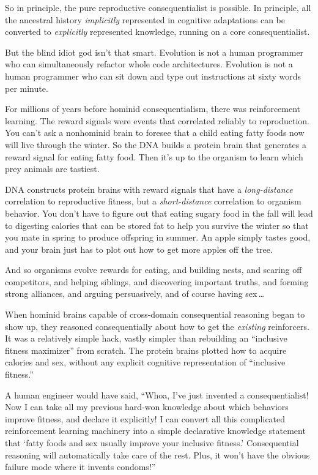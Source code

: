  So in principle, the pure reproductive consequentialist is
possible. In principle, all the ancestral history \textit{implicitly}
represented in cognitive adaptations can be converted to
\textit{explicitly} represented knowledge, running on a core
consequentialist.


 But the blind idiot god isn't that smart.
Evolution is not a human programmer who can simultaneously refactor
whole code architectures. Evolution is not a human programmer who can
sit down and type out instructions at sixty words per minute.


 For millions of years before hominid consequentialism, there was
reinforcement learning. The reward signals were events that correlated
reliably to reproduction. You can't ask a nonhominid
brain to foresee that a child eating fatty foods now will live through
the winter. So the DNA builds a protein brain that generates a reward
signal for eating fatty food. Then it's up to the
organism to learn which prey animals are tastiest.


 DNA constructs protein brains with reward signals that have a
\textit{long-distance} correlation to reproductive fitness, but a
\textit{short-distance} correlation to organism behavior. You
don't have to figure out that eating sugary food in the
fall will lead to digesting calories that can be stored fat to help you
survive the winter so that you mate in spring to produce offspring in
summer. An apple simply tastes good, and your brain just has to plot
out how to get more apples off the tree.


 And so organisms evolve rewards for eating, and building nests,
and scaring off competitors, and helping siblings, and discovering
important truths, and forming strong alliances, and arguing
persuasively, and of course having sex\,\ldots


 When hominid brains capable of cross-domain consequential
reasoning began to show up, they reasoned consequentially about how to
get the \textit{existing} reinforcers. It was a relatively simple hack,
vastly simpler than rebuilding an ``inclusive fitness
maximizer'' from scratch. The protein brains plotted
how to acquire calories and sex, without any explicit cognitive
representation of ``inclusive
fitness.''


 A human engineer would have said, ``Whoa,
I've just invented a consequentialist! Now I can take
all my previous hard-won knowledge about which behaviors improve
fitness, and declare it explicitly! I can convert all this complicated
reinforcement learning machinery into a simple declarative knowledge
statement that `fatty foods and sex usually improve your
inclusive fitness.' Consequential reasoning will
automatically take care of the rest. Plus, it won't
have the obvious failure mode where it invents
condoms!''



